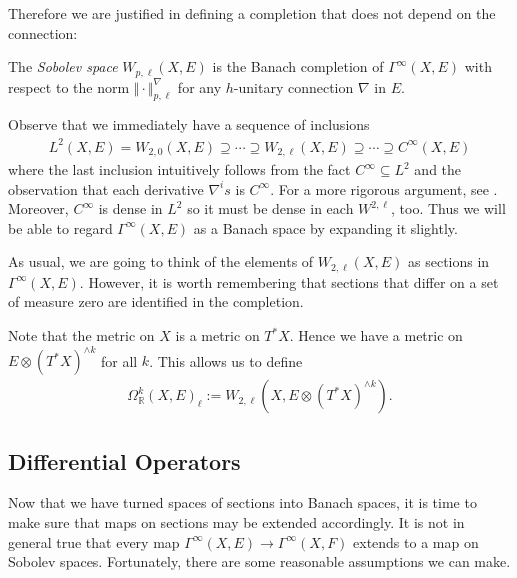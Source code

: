 \documentclass[12pt]{ociamthesis}  %
\begin{document}
Therefore we are justified in defining a completion that does not depend
on the connection:

\begin{definition}
  The \emph{Sobolev space} $W_{p,\ell}(X,E)$ is the Banach completion of
  $\Gamma^\infty(X,E)$ with respect to the norm
  $\Vert\cdot\Vert_{p,\ell}^\nabla$ for any $h$-unitary connection
  $\nabla$ in $E$.
\end{definition}

Observe that we immediately have a sequence of inclusions
\begin{align*}
  L^2(X,E) =
  W_{2,0}(X,E) \supseteq
  \cdots \supseteq
  W_{2,\ell}(X,E) \supseteq
  \cdots
  \supseteq
  C^\infty(X,E)
\end{align*}
where the last inclusion intuitively follows from the fact
$C^\infty \subseteq L^2$ and the observation that each derivative
$\nabla^i s$ is $C^\infty$. For a more rigorous argument, see
\cite[Corollary 3.8.3]{bc2009}.
Moreover, $C^\infty$ is dense in $L^2$ so it must be dense in each
$W^{2,\ell}$, too. Thus we will be able to regard $\Gamma^\infty(X,E)$
as a Banach space by expanding it slightly.

As usual, we are going to think of the elements of $W_{2,\ell}(X,E)$ as
sections in $\Gamma^\infty(X,E)$. However, it is worth remembering that
sections that differ on a set of measure zero are identified in the
completion.

\begin{example}
  Note that the metric on $X$ is a metric on $T^*X$. Hence we have
  a metric on $E\otimes (T^*X)^{\wedge k}$ for all $k$. This allows
  us to define
  \begin{align*}
    \Omega_{\mathbb{R}}^k(X,E)_\ell := W_{2,\ell}(X,E\otimes(T^*X)^{\wedge k}).
  \end{align*}
\end{example}

\subsection{Differential Operators}

Now that we have turned spaces of sections into Banach spaces, it is
time to make sure that maps on sections may be extended accordingly.
It is not in general true that every map
$\Gamma^\infty(X,E)\to\Gamma^\infty(X,F)$ extends to a map on
Sobolev spaces. Fortunately, there are some reasonable assumptions
we can make.
\end{document}
